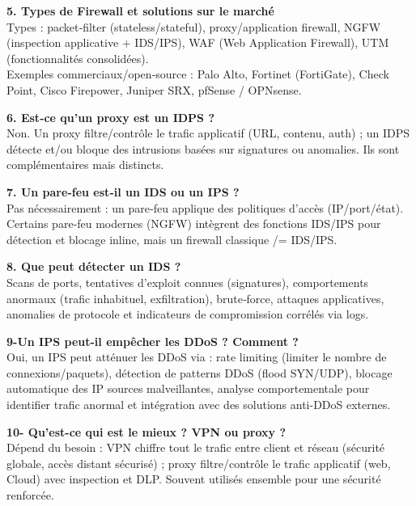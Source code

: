 \medskip

\noindent \textbf{5. Types de Firewall et solutions sur le marché} \\
Types : packet‑filter (stateless/stateful), proxy/application firewall, NGFW (inspection applicative + IDS/IPS), WAF (Web Application Firewall), UTM (fonctionnalités consolidées). \\
Exemples commerciaux/open‑source : Palo Alto, Fortinet (FortiGate), Check Point, Cisco Firepower, Juniper SRX, pfSense / OPNsense.

\medskip

\noindent \textbf{6. Est‑ce qu'un proxy est un IDPS ?} \\
Non. Un proxy filtre/contrôle le trafic applicatif (URL, contenu, auth) ; un IDPS détecte et/ou bloque des intrusions basées sur signatures ou anomalies. Ils sont complémentaires mais distincts.

\medskip

\noindent \textbf{7. Un pare‑feu est‑il un IDS ou un IPS ?} \\
Pas nécessairement : un pare‑feu applique des politiques d'accès (IP/port/état). Certains pare‑feu modernes (NGFW) intègrent des fonctions IDS/IPS pour détection et blocage inline, mais un firewall classique /= IDS/IPS.

\medskip

\noindent \textbf{8. Que peut détecter un IDS ?} \\
Scans de ports, tentatives d'exploit connues (signatures), comportements anormaux (trafic inhabituel, exfiltration), brute‑force, attaques applicatives, anomalies de protocole et indicateurs de compromission corrélés via logs.

\noindent \textbf{9-Un IPS peut-il empêcher les DDoS ? Comment ?} \\
Oui, un IPS peut atténuer les DDoS via : rate limiting (limiter le nombre de connexions/paquets), détection de patterns DDoS (flood SYN/UDP), blocage automatique des IP sources malveillantes, analyse comportementale pour identifier trafic anormal et intégration avec des solutions anti-DDoS externes.

\noindent \textbf{10- Qu’est-ce qui est le mieux ? VPN ou proxy ?} \\
Dépend du besoin : VPN chiffre tout le trafic entre client et réseau (sécurité globale, accès distant sécurisé) ; proxy filtre/contrôle le trafic applicatif (web, Cloud) avec inspection et DLP. Souvent utilisés ensemble pour une sécurité renforcée.


